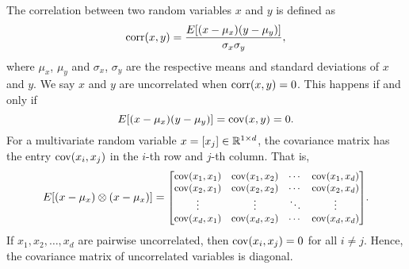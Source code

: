 The correlation between two random variables \(x\) and \(y\) is defined as
\begin{equation}
    \operatorname{corr}(x,y) = \frac{E[(x-\mu_x)(y-\mu_y)]}{\sigma_x \sigma_y},
\end{equation}
where \(\mu_x\), \(\mu_y\) and \(\sigma_x\), \(\sigma_y\) are the respective means and standard deviations of \(x\) and \(y\).
We say \(x\) and \(y\) are uncorrelated when \(\operatorname{corr}(x,y) = 0\).
This happens if and only if
\begin{equation}
    \label{eqn:covariance-formula}
    E[(x-\mu_x)(y-\mu_y)] = \operatorname{cov}(x,y) = 0.
\end{equation}
For a multivariate random variable \(x = [x_j] \in \mathbb{R}^{1 \times d}\), the covariance matrix has the entry \(\operatorname{cov}(x_i, x_j)\) in the \(i\)-th row and \(j\)-th column.
That is,
\begin{equation}
    \label{eqn:covariance-matrix-formula}
    E[(x-\mu_x) \otimes (x-\mu_x)] =
    \scalebox{.9}{\(\begin{bmatrix}
        \cov(x_1, x_1) & \cov(x_1, x_2) & \cdots & \cov(x_1, x_d) \\
        \cov(x_2, x_1) & \cov(x_2, x_2) & \cdots & \cov(x_2, x_d) \\
        \vdots         & \vdots         & \ddots & \vdots         \\
        \cov(x_d, x_1) & \cov(x_d, x_2) & \cdots & \cov(x_d, x_d) \\
    \end{bmatrix}\)}.
\end{equation}
If \(x_1, x_2, \dots, x_d\) are pairwise uncorrelated, then \(\operatorname{cov}(x_i, x_j) = 0\) for all \(i \neq j\).
Hence, the covariance matrix of uncorrelated variables is diagonal.


